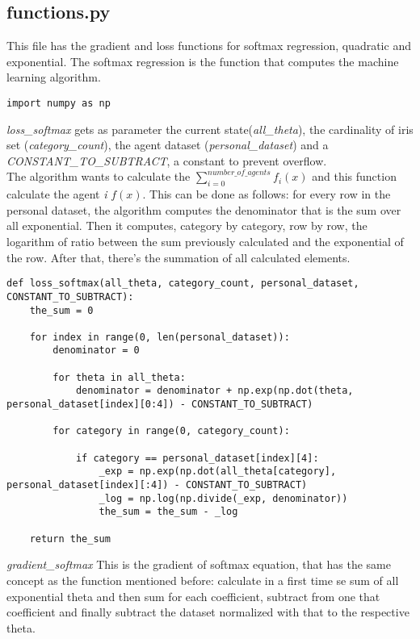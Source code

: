 \documentclass[a4paper,11pt,oneside]{book}
\begin{document}
\subsection{functions.py}

This file has the gradient and loss functions for softmax regression, quadratic and exponential. The softmax regression is the  function
that computes the machine learning algorithm.

\begin{lstlisting}
import numpy as np
\end{lstlisting}

\textit{loss\_softmax} gets as parameter the current state(\textit{all\_theta}), the cardinality of iris set (\textit{category\_count}), the agent
dataset (\textit{personal\_dataset}) and a \textit{CONSTANT\_TO\_SUBTRACT}, a constant to prevent overflow.\\
The algorithm wants to calculate the $\displaystyle\sum_{i=0}^{number\_of\_agents} f_{i}(x)$ and this function calculate the agent \textit{i}
$f(x)$. This can be done as follows: for every row in the personal dataset, the algorithm computes the denominator that is the sum over all
exponential. Then it computes, category by category, row by row, the logarithm of ratio between the sum previously calculated and the exponential of the row.
After that, there's the summation of all calculated elements.

\begin{lstlisting}
def loss_softmax(all_theta, category_count, personal_dataset, CONSTANT_TO_SUBTRACT):
    the_sum = 0

    for index in range(0, len(personal_dataset)):
        denominator = 0

        for theta in all_theta:
            denominator = denominator + np.exp(np.dot(theta, personal_dataset[index][0:4]) - CONSTANT_TO_SUBTRACT)

        for category in range(0, category_count):

            if category == personal_dataset[index][4]:
                _exp = np.exp(np.dot(all_theta[category], personal_dataset[index][:4]) - CONSTANT_TO_SUBTRACT)
                _log = np.log(np.divide(_exp, denominator))
                the_sum = the_sum - _log

    return the_sum
\end{lstlisting}

\textit{gradient\_softmax} This is the gradient of softmax equation, that has the same concept as the function mentioned before: calculate in a
first time se sum of all exponential theta and then sum for each coefficient, subtract from one that coefficient and finally subtract the dataset
normalized with that to the respective theta.
\end{document}
